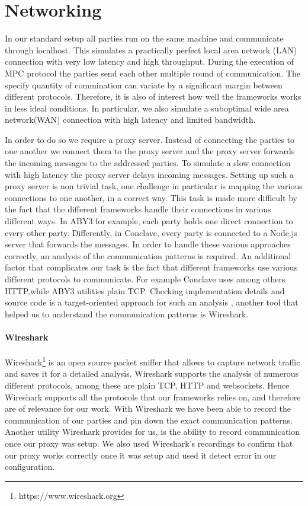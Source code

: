 \section{Networking}
In our standard setup all parties run on the same machine and communicate through localhost. This simulates a practically perfect local area network (LAN) connection with very low latency and high throughput. During the execution of MPC protocol the parties send each other multiple round of communication. The specify quantity of commination can variate by a significant margin between different protocols.  Therefore, it is also of interest how well the frameworks works in less ideal conditions. In particular, we also simulate a suboptimal wide area network(WAN) connection with high latency and limited bandwidth.

In order to do so we require a proxy server. Instead of connecting the parties to one another we connect them to the proxy server and the proxy server forwards the incoming messages to the addressed parties. To simulate a slow connection with high latency the proxy server delays incoming messages. Setting up such a proxy server is non trivial task, one challenge in particular is mapping the various connections to one another, in a correct way. This task is made more difficult by the fact that the different frameworks handle their connections in various different ways. In ABY3 for example, each party holds one direct connection to every other party. Differently, in Conclave, every party is connected to a Node.js server that forwards the messages. In order to handle these various approaches correctly, an analysis of the communication patterns is required. An additional factor that complicates our task is the fact that different frameworks use various different protocols to communicate. For example Conclave uses among others HTTP,while ABY3 utilities plain TCP. Checking implementation details and source code is a target-oriented approach for such an analysis , another tool that helped us to understand the communication patterns is Wireshark.      
\paragraph{Wireshark}
Wireshark\footnote{https://www.wireshark.org} is an open source packet sniffer that allows to capture network traffic and saves it for a detailed analysis. Wireshark supports the analysis of numerous different protocols, among these are plain TCP, HTTP and websockets. Hence Wireshark supports all the protocols that our frameworks relies on, and therefore are of relevance for our work. With Wireshark we have been able to record the communication of our parties and pin down the exact communication patterns. Another utility Wireshark provides for us, is the ability to record communication once our proxy was setup. We also used Wireshark's recordings to confirm that our proxy works correctly once it was setup and used it detect error in our configuration. 
                

